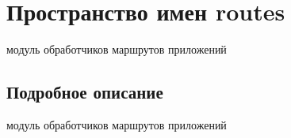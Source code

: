 \hypertarget{namespaceroutes}{}\section{Пространство имен routes}
\label{namespaceroutes}


модуль обработчиков маршрутов приложений  




\subsection{Подробное описание}
модуль обработчиков маршрутов приложений 